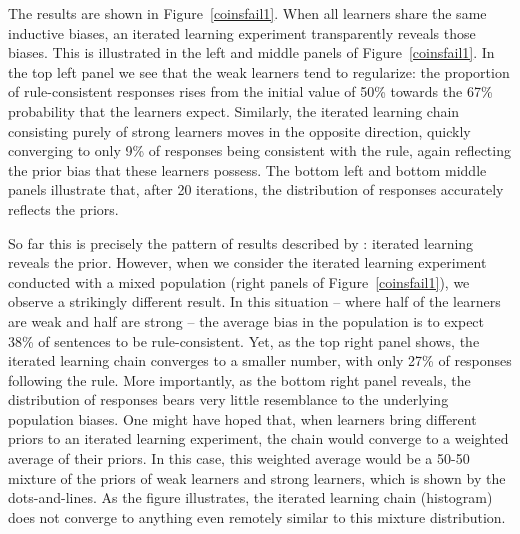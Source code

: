 \documentclass[doc]{apa6}
\begin{document}
The results are shown in Figure~\ref{coinsfail1}. When all learners share the same inductive biases, an iterated learning experiment transparently reveals those biases. This is illustrated in the left and middle panels of Figure~\ref{coinsfail1}. In the top left panel we see that the {\sc weak} learners tend to regularize: the proportion of rule-consistent responses rises from the initial value of 50\% towards the 67\% probability that the learners expect. Similarly, the iterated learning chain consisting purely of {\sc strong} learners moves in the opposite direction, quickly converging to only 9\% of responses being consistent with the rule, again reflecting the prior bias that these learners possess. The bottom left and bottom middle panels illustrate that, after 20 iterations, the distribution of responses accurately reflects the priors.

So far this is precisely the pattern of results described by \textcite{griffiths_language_2007}: iterated learning reveals the prior. However, when we consider the iterated learning experiment conducted with a mixed population (right panels of Figure~\ref{coinsfail1}), we observe a strikingly different result. In this situation -- where half of the learners are {\sc weak} and half are {\sc strong} -- the average bias in the population is to expect 38\% of sentences to be rule-consistent. Yet, as the top right panel shows, the iterated learning chain converges to a smaller number, with only 27\% of responses following the rule. More importantly, as the bottom right panel reveals, the distribution of responses bears very little resemblance to the underlying population biases. One might have hoped that, when learners bring different priors to an iterated learning experiment, the chain would converge to a weighted average of their priors. In this case, this weighted average would be a 50-50 mixture of the priors of {\sc weak} learners and {\sc strong} learners, which is shown by the dots-and-lines. As the figure illustrates, the iterated learning chain (histogram) does not converge to anything even remotely similar to this mixture distribution.
\end{document}

